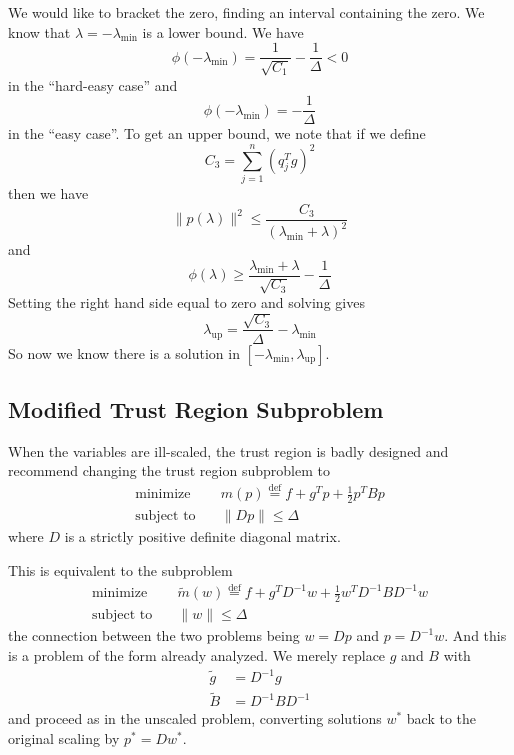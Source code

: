 \documentclass[11pt]{article}
\begin{document}
We would like to bracket the zero, finding an interval containing the
zero.  We know that $\lambda = - \lambda_{\text{min}}$ is a lower bound.
We have
$$
   \phi(- \lambda_{\text{min}}) = \frac{1}{\sqrt{C_1}} - \frac{1}{\Delta}
   < 0
$$
in the ``hard-easy case'' and
$$
   \phi(- \lambda_{\text{min}}) = - \frac{1}{\Delta}
$$
in the ``easy case''.  To get an upper bound, we note that
if we define
\begin{equation} \label{eq:c3}
    C_3 = 
   \sum_{j = 1}^n \left( q_j^T g \right)^2
\end{equation}
then we have
$$
   \lVert p(\lambda) \rVert^2
   \le
   \frac{C_3}{(\lambda_{\text{min}} + \lambda)^2}
$$
and
$$
   \phi(\lambda) \ge \frac{\lambda_{\text{min}} + \lambda}{\sqrt{C_3}}
   - \frac{1}{\Delta}
$$
Setting the right hand side equal to zero and solving gives
$$
   \lambda_{\text{up}} = \frac{\sqrt{C_3}}{\Delta} - \lambda_{\text{min}}
$$
So now we know there is a solution
in $[- \lambda_{\text{min}}, \lambda_{\text{up}}]$.

\subsection{Modified Trust Region Subproblem} \label{sec:subproblem-modified}

When the variables are ill-scaled, the trust region is badly designed
and \citet[Section~4.4]{naw} recommend changing the trust region
subproblem to
\begin{align*}
   \text{minimize} &
   \quad m(p) \stackrel{\text{def}}{=} f + g^T p + \tfrac{1}{2} p^T B p
   \\
   \text{subject to} & \quad \lVert D p \lVert \le \Delta
\end{align*}
where $D$ is a strictly positive definite diagonal matrix.

This is equivalent to the subproblem
\begin{align*}
   \text{minimize} &
   \quad \tilde{m}(w) \stackrel{\text{def}}{=} f + g^T D^{-1} w
   + \tfrac{1}{2} w^T D^{-1} B D^{-1} w
   \\
   \text{subject to} & \quad \lVert w \lVert \le \Delta
\end{align*}
the connection between the two problems being $w = D p$ and $p = D^{-1} w$.
And this is a problem of the form already analyzed.  We merely replace
$g$ and $B$ with
\begin{align*}
   \tilde{g} & = D^{-1} g
   \\
   \widetilde{B} & = D^{-1} B D^{-1}
\end{align*}
and proceed as in the unscaled problem, converting solutions $w^*$
back to the original scaling by $p^* = D w^*$.
\end{document}
